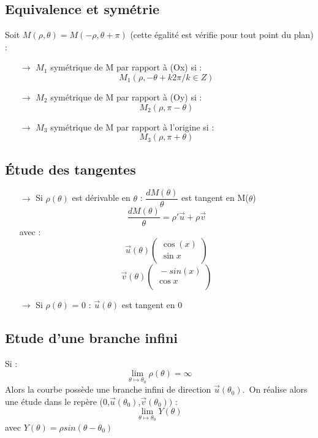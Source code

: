 \subsection{Equivalence et symétrie}
Soit $M(\rho,\theta) = M(-\rho,\theta + \pi)$ (cette égalité est vérifie pour tout point du plan) :
\begin{itemize}
 \item[$\rightarrow$] $M_1$ symétrique de M par rapport à (Ox) si :
$$M_1(\rho, -\theta + k2\pi / k \in Z)$$
\item[$\rightarrow$] $M_2$ symétrique de M par rapport à (Oy) si :
$$M_2(\rho, \pi -\theta)$$
\item[$\rightarrow$] $M_3$ symétrique de M par rapport à l'origine si :
$$M_3(\rho, \pi + \theta)$$
\end{itemize}
\subsection{Étude des tangentes}
\begin{itemize}
 \item[$\rightarrow$] Si $\rho(\theta)$ est dérivable en $\theta$ : $\dfrac{dM(\theta)}{\theta}$ est tangent en M($\theta$)
$$\dfrac{dM(\theta)}{\theta} = \rho'\overrightarrow{u} + \rho\overrightarrow{v}$$
avec : 
$$\overrightarrow{u}(\theta)\begin{pmatrix}
  \cos(x)  \\
  \sin x  \\
\end{pmatrix}$$
$$\overrightarrow{v}(\theta)\begin{pmatrix}
  \ -sin(x)  \\
  \cos x  \\
\end{pmatrix}$$
\item[$\rightarrow$] Si $\rho(\theta)$ = 0 : $\overrightarrow{u}(\theta)$ est tangent en 0
\end{itemize}
\subsection{Etude d'une branche infini}
Si : $$\lim_{\theta \mapsto \theta_0} \rho(\theta) = \infty$$
Alors la courbe possède une branche infini de direction $\overrightarrow{u}(\theta_0)$.\
On réalise alors une étude dans le repère (0,$\overrightarrow{u}(\theta_0)$,$\overrightarrow{v}(\theta_0))$ : 
$$\lim_{\theta \mapsto \theta_0} Y(\theta)$$
avec $Y(\theta) = \rho sin(\theta - \theta_0)$
